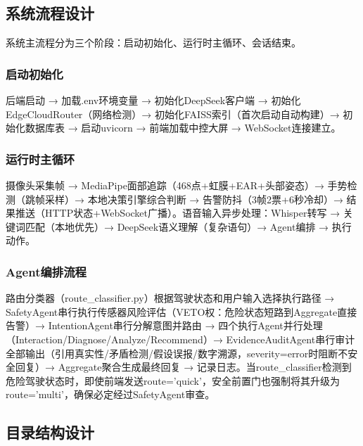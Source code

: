 \documentclass[a4paper]{article}
\begin{document}
\subsection{系统流程设计}

系统主流程分为三个阶段：启动初始化、运行时主循环、会话结束。

\subsubsection{启动初始化}

后端启动 → 加载.env环境变量 → 初始化DeepSeek客户端 → 初始化EdgeCloudRouter（网络检测）→ 初始化FAISS索引（首次启动自动构建）→ 初始化数据库表 → 启动uvicorn → 前端加载中控大屏 → WebSocket连接建立。

\subsubsection{运行时主循环}

摄像头采集帧 → MediaPipe面部追踪（468点+虹膜+EAR+头部姿态）→ 手势检测（跳帧采样）→ 本地决策引擎综合判断 → 告警防抖（3帧2票+6秒冷却）→ 结果推送（HTTP状态+WebSocket广播）。语音输入异步处理：Whisper转写 → 关键词匹配（本地优先）→ DeepSeek语义理解（复杂语句）→ Agent编排 → 执行动作。

\subsubsection{Agent编排流程}

路由分类器（route\_classifier.py）根据驾驶状态和用户输入选择执行路径 → SafetyAgent串行执行传感器风险评估（VETO权：危险状态短路到Aggregate直接告警）→ IntentionAgent串行分解意图并路由 → 四个执行Agent并行处理（Interaction/Diagnose/Analyze/Recommend）→ EvidenceAuditAgent串行审计全部输出（引用真实性/矛盾检测/假设误报/数字溯源，severity=error时阻断不安全回复）→ Aggregate聚合生成最终回复 → 记录日志。当route\_classifier检测到危险驾驶状态时，即使前端发送route='quick'，安全前置门也强制将其升级为route='multi'，确保必定经过SafetyAgent审查。

\subsection{目录结构设计}
\end{document}
